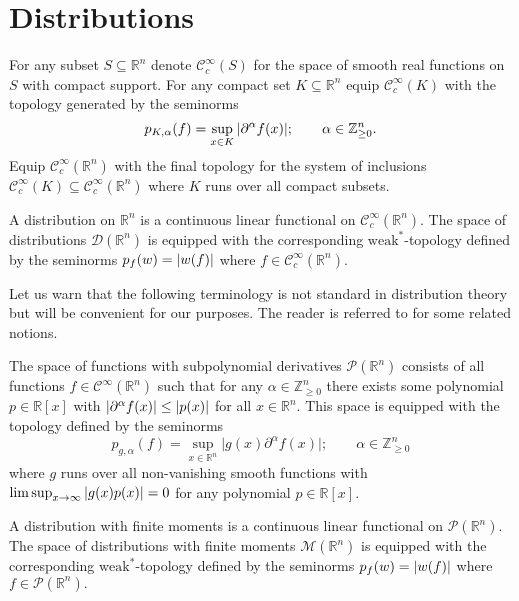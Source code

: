 \section{Distributions}\label{sec: Distributions}
For any subset $S\subseteq \mathbb{R}^n$ denote $\mathcal{C}_c^\infty(S)$ for the space of smooth real functions on $S$ with compact support.
For any compact set $K\subseteq \mathbb{R}^n$ equip $\mathcal{C}^\infty_c(K)$ with the topology generated by the seminorms
$$p_{K,\alpha}(f) = \sup_{x\in K} \vert \partial^\alpha f(x) \vert;\qquad \alpha\in \mathbb{Z}_{\geq 0}^n.$$
Equip $\mathcal{C}_c^\infty(\mathbb{R}^n)$ with the final topology for the system of inclusions $\mathcal{C}_c^\infty(K)\subseteq \mathcal{C}_c^\infty(\mathbb{R}^n)$ where $K$ runs over all compact subsets.
\begin{definition}\label{def: Distribution}
  A distribution on $\mathbb{R}^n$ is a continuous linear functional on $\mathcal{C}_c^\infty(\mathbb{R}^n)$.
  The space of distributions $\mathcal{D}(\mathbb{R}^n)$ is equipped with the corresponding $\text{weak}^*$-topology defined by the seminorms $p_{f}(w) = \vert w(f) \vert$ where $f\in \mathcal{C}_c^\infty(\mathbb{R}^n).$
\end{definition}
Let us warn that the following terminology is not standard in distribution theory but will be convenient for our purposes.
The reader is referred to \cite[Chapter 4]{horvath2012topological} for some related notions.
\begin{definition}
  The space of functions with subpolynomial derivatives $\mathcal{P}(\mathbb{R}^n)$ consists of all functions $f\in \mathcal{C}^\infty(\mathbb{R}^n)$ such that for any $\alpha\in \mathbb{Z}_{\geq 0}^n$ there exists some polynomial $p\in \mathbb{R}[x]$ with $\vert \partial^\alpha f(x) \vert\leq \vert p(x) \vert$ for all $x\in\mathbb{R}^n$.
  This space is equipped with the topology defined by the seminorms $$p_{g,\alpha}(f) = \sup_{x\in \mathbb{R}^n} \vert g(x)\partial^\alpha f(x)\vert ;\qquad \alpha\in \mathbb{Z}_{\geq 0}^n$$
  where $g$ runs over all non-vanishing smooth functions with $\limsup_{x\to \infty} \vert g(x)p(x) \vert = 0$ for any polynomial $p\in \mathbb{R}[x]$.
\end{definition}
\begin{definition}\label{def: DistributionWithMoments}
  A distribution with finite moments is a continuous linear functional on $\mathcal{P}(\mathbb{R}^n)$.
  The space of distributions with finite moments $\mathcal{M}(\mathbb{R}^n)$ is equipped with the corresponding $\text{weak}^*$-topology defined by the seminorms  $p_{f}(w) = \vert w(f) \vert$ where $f\in \mathcal{P}(\mathbb{R}^n).$
\end{definition}
